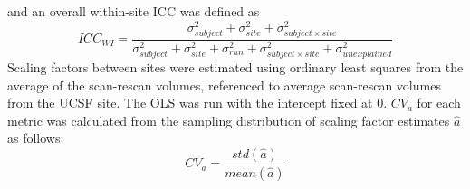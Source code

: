 \documentclass{article}
\begin{document}
and an overall within-site ICC was defined as
\begin{equation}
ICC_{WI} = \frac{\sigma_{subject}^2 + \sigma_{site}^2 + \sigma_{subject \times site }^2 }{\sigma_{subject}^2+\sigma_{site}^2+\sigma_{run}^2+\sigma_{subject \times site}^2 + \sigma_{unexplained}^2}
\end{equation}
Scaling factors between sites were estimated using ordinary least squares from the average of the scan-rescan volumes, referenced to average scan-rescan volumes from the UCSF site. The OLS was run with the intercept fixed at 0. $CV_a$ for each metric was calculated from the sampling distribution of scaling factor estimates $\hat{a}$ as follows: %
\begin{equation}
CV_{a} = \frac{std(\hat{a})}{mean(\hat{a})}
\label{eq:cvadef}
\end{equation}
\end{document}
